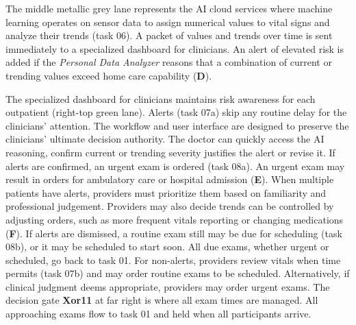 The middle metallic grey lane represents the AI cloud services where machine learning operates on sensor data to assign numerical values to vital signs and analyze their trends (task 06).
A packet of values and trends over time is sent immediately to a specialized dashboard for clinicians.
An alert of elevated risk is added if the \emph{Personal Data Analyzer} reasons that a combination of current or trending values exceed home care capability (\textbf{D}).

The specialized dashboard for clinicians maintains risk awareness for each outpatient (right-top green lane).
Alerts (task 07a) skip any routine delay for the clinicians' attention.
The workflow and user interface are designed to preserve the clinicians' ultimate decision authority.
The doctor can quickly access the AI reasoning, confirm current or trending severity justifies the alert or revise it.
If alerts are confirmed, an urgent exam is ordered (task 08a).
An urgent exam may result in orders for ambulatory care or hospital admission (\textbf{E}).
When multiple patients have alerts, providers must prioritize them based on familiarity and professional judgement.
Providers may also decide trends can be controlled by adjusting orders, such as more frequent vitals reporting or changing medications (\textbf{F}).
If alerts are dismissed, a routine exam still may be due for scheduling (task 08b), or it may be scheduled to start soon.
All due exams, whether urgent or scheduled, go back to task 01. 
For non-alerts, providers review vitals when time permits (task 07b) and may order routine exams to be scheduled.
Alternatively, if clinical judgment deems appropriate, providers may order urgent exams.
The decision gate \textbf{Xor11} at far right is where all exam times are managed. All approaching exams flow to task 01 and held when all participants arrive.
